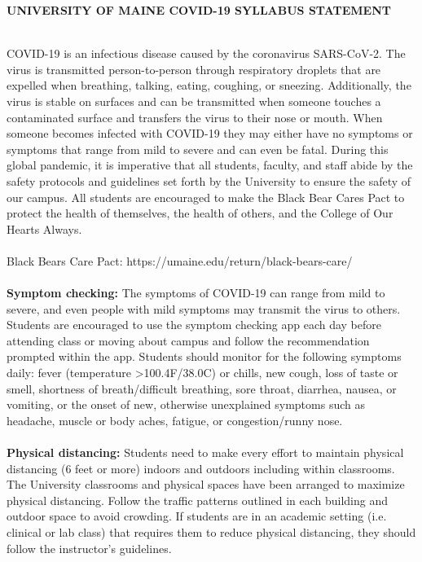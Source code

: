 \documentclass[11pt]{article}
\begin{document}
\newpage
\begin{center}\textbf{UNIVERSITY OF MAINE COVID-19 SYLLABUS STATEMENT}\end{center}
~\\ 
COVID-19 is an infectious disease caused by the coronavirus SARS-CoV-2. The virus is transmitted person-to-person through respiratory droplets that are expelled when breathing, talking, eating, coughing, or sneezing. Additionally, the virus is stable on surfaces and can be transmitted when someone touches a contaminated surface and transfers the virus to their nose or mouth. When someone becomes infected with COVID-19 they may either have no symptoms or symptoms that range from mild to severe and can even be fatal. During this global pandemic, it is imperative that all students, faculty, and staff abide by the safety protocols and guidelines set forth by the University to ensure the safety of our campus. All students are encouraged to make the Black Bear Cares Pact to protect the health of themselves, the health of others, and the College of Our Hearts Always.\\~\\
Black Bears Care Pact: https://umaine.edu/return/black-bears-care/ \\~\\
\textbf{Symptom checking:} The symptoms of COVID-19 can range from mild to severe, and even people with mild symptoms may transmit the virus to others. Students are encouraged to use the symptom checking app each day before attending class or moving about campus and follow the recommendation prompted within the app. Students should monitor for the following symptoms daily: fever (temperature >100.4F/38.0C) or chills, new cough, loss of taste or smell, shortness of breath/difficult breathing, sore throat, diarrhea, nausea, or vomiting, or the onset of new, otherwise unexplained symptoms such as headache, muscle or body aches, fatigue, or congestion/runny nose.\\~\\
\textbf{Physical distancing:} Students need to make every effort to maintain physical distancing (6 feet or more) indoors and outdoors including within classrooms. The University classrooms and physical spaces have been arranged to maximize physical distancing. Follow the traffic patterns outlined in each building and outdoor space to avoid crowding. If students are in an academic setting (i.e. clinical or lab class) that requires them to reduce physical distancing, they should follow the instructor’s guidelines.\\~\\
\end{document}
